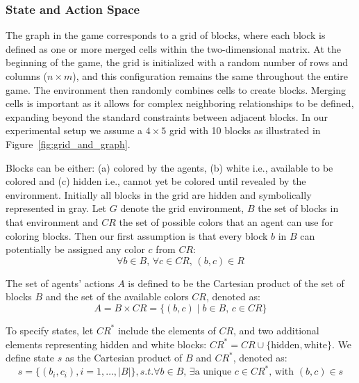     \subsubsection{State and Action Space}

        The graph in the game corresponds to a grid of blocks, where each block is defined as one or more merged cells within the two-dimensional matrix. At the beginning of the game, the grid is initialized with a random number of rows and columns ($n \times m$), and this configuration remains the same throughout the entire game. The environment then randomly combines cells to create blocks. Merging cells is important as it allows for complex neighboring relationships to be defined, expanding beyond the standard constraints between adjacent blocks. In our experimental setup we assume a $4 \times 5$ grid with 10 blocks as illustrated in Figure~\ref{fig:grid_and_graph}.\tinydouble

        \noindent
        Blocks can be either: (a) colored by the agents, (b) white i.e., available to be colored and (c) hidden i.e., cannot yet be colored until revealed by the environment. Initially all blocks in the grid are hidden and symbolically represented in gray. Let $G$ denote the grid environment, $B$ the set of blocks in that environment and $CR$ the set of possible colors that an agent can use for coloring blocks. Then our first assumption is that every block $b$ in $B$ can potentially be assigned any color $c$ from $CR$:
        \begin{equation}
            \forall b \in B, \, \forall c \in CR, \, (b, c) \in R 
            \label{eq:bc}
        \end{equation}

        \noindent
        The set of agents' actions $A$ is defined to be the Cartesian product of the set of blocks $B$ and the set of the available colors $CR$, denoted as:
        \begin{equation}
            A = B \times CR = \{(b, c) \mid b \in B, \, c \in CR\} 
            \label{eq:action_space}
        \end{equation}

        \noindent
        To specify states, let $CR^*$ include the elements of $CR$, and two additional elements representing hidden and white blocks: $CR^* = CR \cup \{\text{hidden}, \text{white}\}$. We define state $s$ as the Cartesian product of $B$ and $CR^*$, denoted as:
        \begin{equation}
            s = \{(b_i, c_i), i=1, \dots, |B|\}, s.t. \forall b \in B, \, \exists \text{a unique } c \in CR^*\text{, with } (b,c) \in s
            \label{eq:state}
        \end{equation}

